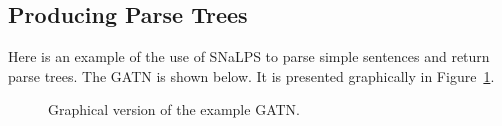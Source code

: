 \documentclass{book}
\begin{document}
\subsection{Producing Parse Trees}\label{ptreesxpl}
Here is an example of the use of SNaLPS to parse simple sentences and
return parse trees.  The GATN is shown below.  It is presented
graphically in Figure~\ref{gatnfig1}.
\begin{figure}
\caption{Graphical version of the example GATN.}\label{gatnfig1}
\end{figure}
\end{document}
